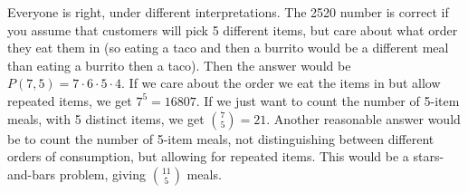 \protect \documentclass [10pt]{exam}
\renewenvironment{Ans}[1]{\setcounter{question}{#1}\addtocounter{question}{-1}\question }{}
\begin{document}
\begin{questions}
\begin{Ans}{18}
\end{Ans}
\begin{Ans}{19}
    Everyone is right, under different interpretations.  The 2520 number is correct if you assume that customers will pick 5 different items, but care about what order they eat them in (so eating a taco and then a burrito would be a different meal than eating a burrito then a taco).  Then the answer would be $P(7,5) = 7\cdot 6 \cdot 5 \cdot 4$.  If we care about the order we eat the items in but allow repeated items, we get $7^5 = 16807$.  If we just want to count the number of 5-item meals, with 5 distinct items, we get ${7 \choose 5} = 21$.  Another reasonable answer would be to count the number of 5-item meals, not distinguishing between different orders of consumption, but allowing for repeated items.  This would be a stars-and-bars problem, giving ${11 \choose 5}$ meals.
  
\end{Ans}
\begin{Ans}{20}
\end{Ans}
\end{questions}
\end{document}
